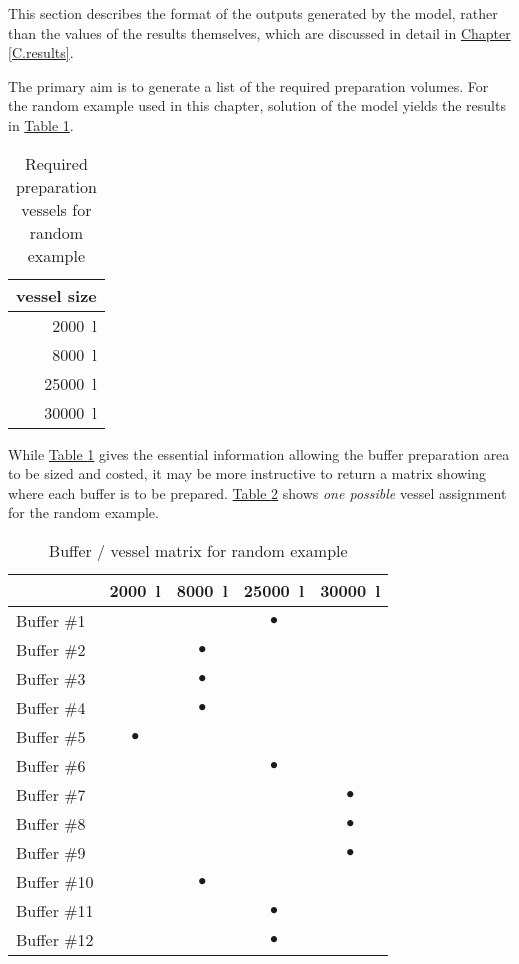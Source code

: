 This section describes the format of the outputs generated by the model, rather
than the values of the results themselves, which are discussed in detail in 
\hyperref[C.results]{Chapter \ref*{C.results}}.

The primary aim is to generate a list of the required preparation volumes.
For the random example used in this chapter, solution of the model yields
the results in \hyperref[tbl.reqvessels]{Table \ref*{tbl.reqvessels}}.

\begin{table}[h!]
    \centering
    \caption{Required preparation vessels for random example}
    \label{tbl.reqvessels}
    \begin{tabular}{r}
        vessel size\\ \hline
        \SI{2000}{\litre}\\
        \SI{8000}{\litre}\\
        \SI{25000}{\litre}\\
        \SI{30000}{\litre}\\
    \end{tabular}
\end{table}

While \hyperref[tbl.reqvessels]{Table \ref*{tbl.reqvessels}} gives the
essential information allowing the buffer preparation area to be sized and
costed, it may be more instructive to return a matrix showing where each buffer
is to be prepared. 
\hyperref[tbl.bvmatrix]{Table \ref*{tbl.bvmatrix}} shows \emph{one possible}
vessel assignment for the random example.

\begin{table}[h!]
    \centering
    \caption{Buffer / vessel matrix for random example}
    \label{tbl.bvmatrix}
    \begin{tabular}{l | c | c | c | c }
        & \SI{2000}{\litre} & \SI{8000}{\litre} & \SI{25000}{\litre} &
        \SI{30000}{\litre}\\ \hline
        Buffer \#1  & & & $\bullet$ & \\
        Buffer \#2  & & $\bullet$ & & \\
        Buffer \#3  & & $\bullet$ & & \\
        Buffer \#4  & & $\bullet$ & & \\
        Buffer \#5  & $\bullet$ & & & \\
        Buffer \#6  & & & $\bullet$ & \\
        Buffer \#7  & & & & $\bullet$ \\
        Buffer \#8  & & & & $\bullet$ \\
        Buffer \#9  & & & & $\bullet$ \\
        Buffer \#10 & & $\bullet$ & & \\
        Buffer \#11 & & & $\bullet$ & \\
        Buffer \#12 & & & $\bullet$ & \\
    \end{tabular}
\end{table}

